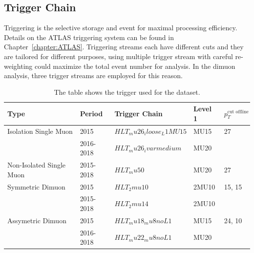

\subsection{Trigger Chain}
\label{section:trigger}
Triggering is the selective storage and event for maximal processing efficiency. Details on the ATLAS triggering system can be found in Chapter~\ref{chapter:ATLAS}.
Triggering streams each have different cuts and they are tailored for different purposes, using multiple trigger stream with careful re-weighting could maximize the total event number for analysis. In the dimuon analysis, three trigger streams are employed for this reason.

\begin{table}[!htb]
    \begin{center}
    \caption{
        The table shows the trigger used for the dataset.
    }
\label{tab:Data Trigger}
\begin{tabular}{|l|l|l|l|l}
\hline
\textbf{Type}   & \textbf{Period}                                                         &\textbf{Trigger Chain} &\textbf{Level 1} &\textbf{$p_{T}^{\textrm{cut offline}}$}\\ \hline
Isolation Single Muon   & 2015 & $HLT_mu26_iloose_L1MU15$ & MU15 & 27 \\ 
                        & 2016-2018  & $HLT_mu26_ivarmedium$    & MU20 & \\ \hline
Non-Isolated Single Muon & 2015-2018                                       &$HLT_mu50$& MU20& 27 \\ \hline
Symmetric Dimuon & 2015 & $HLT_2mu10$ & 2MU10 & 15, 15 \\
                 & 2015-2018 & $HLT_2mu14$ & 2MU10 & \\ \hline
Assymetric Dimuon & 2015 & $HLT_mu18_mu8noL1$ & MU15 & 24, 10 \\
                  & 2016-2018 & $HLT_mu22_mu8noL1$ & MU20 \\ \hline
\end{tabular}
\end{center}
\end{table}

